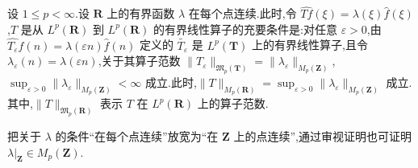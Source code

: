 \begin{theorem}\label{thm:3.5.18}
设 $1 \leq p < \infty$.设 $\mathbf{R}$ 上的有界函数 $\lambda$ 在每个点连续.此时,令 $\widehat{Tf}(\xi) = \lambda(\xi)\widehat{f}(\xi)$,$T$ 是从 $L^{p}(\mathbf{R})$ 到 $L^{p}(\mathbf{R})$ 的有界线性算子的充要条件是:对任意 $\varepsilon > 0$,由 $\widehat{T_{\varepsilon}}f(n) = \lambda(\varepsilon n)\widehat{f}(n)$ 定义的 $\widetilde{T_{\varepsilon}}$ 是 $L^{p}(\mathbf{T})$ 上的有界线性算子,且令 $\lambda_{\varepsilon}(n) = \lambda(\varepsilon n)$,关于其算子范数 $\|T_{\varepsilon}\|_{\mathfrak{M}_{p}(\mathbf{T})} = \|\lambda_{\varepsilon}\|_{M_{p}(\mathbf{Z})}$,$\sup_{\varepsilon > 0}\|\lambda_{\varepsilon}\|_{M_{p}(\mathbf{Z})} < \infty$ 成立.此时,$\|T\|_{M_{p}(\mathbf{R})} = \sup_{\varepsilon > 0}\|\lambda_{\varepsilon}\|_{M_{p}(\mathbf{Z})}$ 成立.其中,$\|T\|_{\mathfrak{M}_{p}(\mathbf{R})}$ 表示 $T$ 在 $L^{p}(\mathbf{R})$ 上的算子范数.
\end{theorem}

\begin{note}\label{note:3.5.19}
把关于 $\lambda$ 的条件``在每个点连续''放宽为``在 $\mathbf{Z}$ 上的点连续'',通过审视证明也可证明 $\lambda|_{\mathbf{Z}} \in M_{p}(\mathbf{Z})$.
\end{note}

